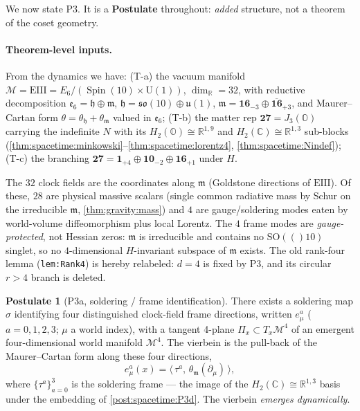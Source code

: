 \documentclass[11pt]{article}
\theoremstyle{plain}
\theoremstyle{definition}
\newtheorem{postulate}[theorem]{Postulate}
\theoremstyle{remark}
\newcommand{\SO}[1]{\mathrm{SO}(#1)}
\newcommand{\U}[1]{\mathrm{U}(#1)}
\newcommand{\Spin}{\operatorname{Spin}}
\newcommand{\Uone}{\U{1}}
\newcommand{\EIII}{\mathrm{EIII}}
\begin{document}
We now state P3. It is a \textbf{Postulate} throughout: \emph{added} structure, not a
theorem of the coset geometry.

\paragraph{Theorem-level inputs.}
From the dynamics we have: (T-a) the vacuum manifold
$\mathcal M=\EIII=E_6/(\Spin(10)\times\Uone)$, $\dim_{\mathbb R}=32$, with reductive
decomposition $\mathfrak e_6=\mathfrak h\oplus\mathfrak m$,
$\mathfrak h=\mathfrak{so}(10)\oplus\mathfrak u(1)$,
$\mathfrak m=\mathbf{16}_{-3}\oplus\overline{\mathbf{16}}_{+3}$, and Maurer--Cartan
form $\theta=\theta_{\mathfrak h}+\theta_{\mathfrak m}$ valued in $\mathfrak e_6$;
(T-b) the matter rep $\mathbf{27}=J_3(\mathbb O)$ carrying the indefinite $N$ with its
$H_2(\mathbb O)\cong\mathbb R^{1,9}$ and $H_2(\mathbb C)\cong\mathbb R^{1,3}$ sub-blocks
(\autoref{thm:spacetime:minkowski}--\autoref{thm:spacetime:lorentz4},
\autoref{thm:spacetime:Nindef}); (T-c) the branching
$\mathbf{27}=\mathbf 1_{+4}\oplus\mathbf{10}_{-2}\oplus\mathbf{16}_{+1}$ under $H$.

The $32$ clock fields are the coordinates along $\mathfrak m$ (Goldstone directions of
$\EIII$). Of these, $28$ are physical massive scalars (single common radiative mass by
Schur on the irreducible $\mathfrak m$, \autoref{thm:gravity:mass}) and $4$ are
gauge/soldering modes eaten by world-volume diffeomorphism plus local Lorentz. The $4$
frame modes are \emph{gauge-protected}, not Hessian zeros: $\mathfrak m$ is
irreducible and contains no $\SO(10)$ singlet, so no $4$-dimensional $H$-invariant
subspace of $\mathfrak m$ exists. The old rank-four lemma (\texttt{lem:Rank4}) is
hereby relabeled: $d=4$ is fixed by P3, and its circular $r>4$ branch is deleted.

\begin{postulate}[P3a, soldering / frame identification]\label{post:spacetime:P3a}
There exists a soldering map $\sigma$ identifying four distinguished clock-field frame
directions, written $e^a_\mu$ ($a=0,1,2,3$; $\mu$ a world index), with a tangent
4-plane $\Pi_x\subset T_x\mathcal M^4$ of an emergent four-dimensional world manifold
$\mathcal M^4$. The vierbein is the pull-back of the Maurer--Cartan form along these
four directions,
\begin{equation}\label{eq:spacetime:vierbein}
  e^a_\mu(x)=\bigl\langle\,\tau^a,\,\theta_{\mathfrak m}(\partial_\mu)\,\bigr\rangle,
\end{equation}
where $\{\tau^a\}_{a=0}^{3}$ is the soldering frame --- the image of the
$H_2(\mathbb C)\cong\mathbb R^{1,3}$ basis under the embedding of
\autoref{post:spacetime:P3d}. The vierbein \emph{emerges dynamically}.
\end{postulate}
\end{document}
